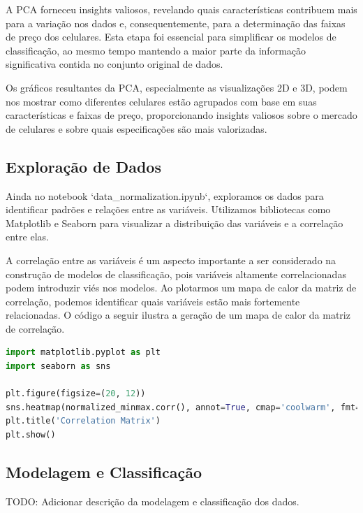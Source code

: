 \documentclass[conference]{IEEEtran}
\begin{document}
A PCA forneceu insights valiosos, revelando quais características contribuem 
mais para a variação nos dados e, consequentemente, para a determinação 
das faixas de preço dos celulares. 
Esta etapa foi essencial para simplificar os modelos de classificação, 
ao mesmo tempo mantendo a maior parte da informação significativa contida 
no conjunto original de dados.

Os gráficos resultantes da PCA, especialmente as visualizações 2D e 3D, 
podem nos mostrar como diferentes celulares estão agrupados com base em 
suas características e faixas de preço, proporcionando insights valiosos 
sobre o mercado de celulares e sobre quais especificações são mais valorizadas.

\subsection{Exploração de Dados}

Ainda no notebook `data\_normalization.ipynb`,
exploramos os dados para identificar padrões e relações entre as variáveis.
Utilizamos bibliotecas como Matplotlib e Seaborn para visualizar a distribuição
das variáveis e a correlação entre elas.
 
A correlação entre as variáveis é um aspecto importante a ser considerado
na construção de modelos de classificação, pois variáveis altamente correlacionadas
podem introduzir viés nos modelos. Ao plotarmos um mapa de calor da matriz de correlação,
podemos identificar quais variáveis estão mais fortemente relacionadas.
O código a seguir ilustra a geração de um mapa de calor da matriz de correlação.

\begin{lstlisting}[language=Python]
import matplotlib.pyplot as plt
import seaborn as sns

plt.figure(figsize=(20, 12))
sns.heatmap(normalized_minmax.corr(), annot=True, cmap='coolwarm', fmt='.2f', linewidths=2)
plt.title('Correlation Matrix')
plt.show()
\end{lstlisting}

\subsection{Modelagem e Classificação}
TODO: Adicionar descrição da modelagem e classificação dos dados.

\end{document}
